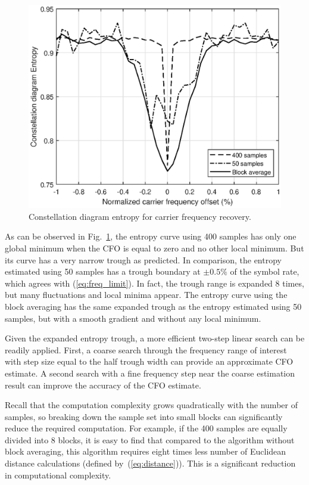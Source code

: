 \documentclass[12pt, draftclsnofoot, onecolumn]{IEEEtran}
\begin{document}

\begin{figure}[ht]
\centering
\includegraphics[width=3.1 in]{pic/freq-k.eps}
\caption{Constellation diagram entropy for carrier frequency recovery.}
\label{fig:freq_entp} 
\end{figure}   

As can be observed in Fig.~\ref{fig:freq_entp}, the entropy curve using 400 samples has only one global minimum when the CFO is equal to zero and no other local minimum.
But its curve has a very narrow trough as predicted.
In comparison, the entropy estimated using 50 samples has a trough boundary at \(\pm 0.5\%\) of the symbol rate, which agrees with (\ref{eq:freq_limit}).
In fact, the trough range is expanded 8 times, but many fluctuations and local minima appear.
The entropy curve using the block averaging has the same expanded trough as the entropy estimated using 50 samples, but with a smooth gradient and without any local minimum.

Given the expanded entropy trough, a more efficient two-step linear search can be readily applied.
First, a coarse search through the frequency range of interest with step size equal to the half trough width can provide an approximate CFO estimate.
A second search with a fine frequency step near the coarse estimation result can improve the accuracy of the CFO estimate.

Recall that the computation complexity grows quadratically with the number of samples, so breaking down the sample set into small blocks can significantly reduce the required computation.
For example, if the 400 samples are equally divided into 8 blocks, it is easy to find that compared to the algorithm without block averaging, 
this algorithm requires eight times less number of Euclidean distance calculations (defined by~(\ref{eq:distance})). 
This is a significant reduction in computational complexity. 
\end{document}
